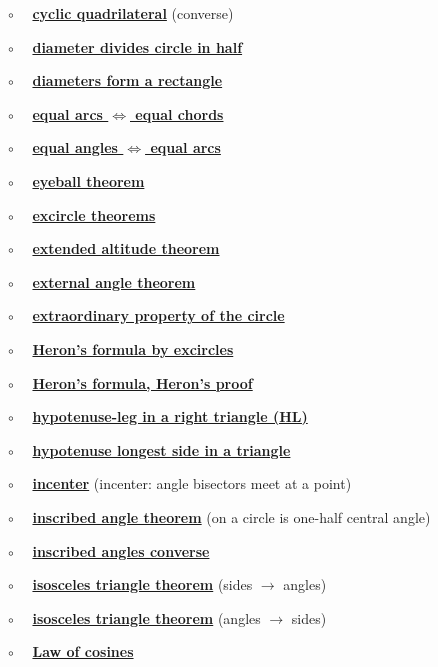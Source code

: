 \documentclass[11pt, oneside]{article}
\begin{document}
$\circ$ \ \ \hyperref[sec:inscribed_angles_converse]{\textbf{cyclic quadrilateral}} (converse)

$\circ$ \ \ \hyperref[sec:diameter_of_a_circle]{\textbf{diameter divides circle in half}}

$\circ$ \ \ \hyperref[sec:diameters_form_rectangle]{\textbf{diameters form a rectangle}}

$\circ$ \ \ \hyperref[sec:equal_arcs_equal_chords]{\textbf{equal arcs $\iff$ equal chords}}

$\circ$ \ \ \hyperref[sec:angles_on_same_arc]{\textbf{equal angles $\iff$ equal arcs}}

$\circ$ \ \ \hyperref[sec:eyeball_theorem]{\textbf{eyeball theorem}}

$\circ$ \ \ \hyperref[sec:excircle_theorems]{\textbf{excircle theorems}}

$\circ$ \ \ \hyperref[sec:extended_altitude]{\textbf{extended altitude theorem}}

$\circ$ \ \ \hyperref[sec:external_angle_theorem]{\textbf{external angle theorem}}

$\circ$ \ \ \hyperref[sec:extraordinary_property]{\textbf{extraordinary property of the circle}}

$\circ$ \ \ \hyperref[sec:Heron_formula_excircles]{\textbf{Heron's formula by excircles}}

$\circ$ \ \ \hyperref[sec:Heron_formula_Heron]{\textbf{Heron's formula, Heron's proof}}

$\circ$ \ \ \hyperref[sec:SSA_in_right]{\textbf{hypotenuse-leg in a right triangle (HL)}}

$\circ$ \ \ \hyperref[sec:hypotenuse_longest]{\textbf{hypotenuse longest side in a triangle}}

$\circ$ \ \ \hyperref[sec:incenter]{\textbf{incenter}} (incenter:  angle bisectors meet at a point)

$\circ$ \ \ \hyperref[sec:inscribed_angle_theorem]{\textbf{inscribed angle theorem}} (on a circle is one-half central angle)

$\circ$ \ \ \hyperref[sec:inscribed_angles_converse]{\textbf{inscribed angles converse}}

$\circ$ \ \  \hyperref[sec:isosceles_triangle_theorem]{\textbf{isosceles triangle theorem}} (sides $\rightarrow$ angles)

$\circ$ \ \  \hyperref[sec:isosceles_converse]{\textbf{isosceles triangle theorem}} (angles $\rightarrow$ sides)

$\circ$ \ \ \hyperref[sec:law_of_cosines]{\textbf{Law of cosines}}
\end{document}
